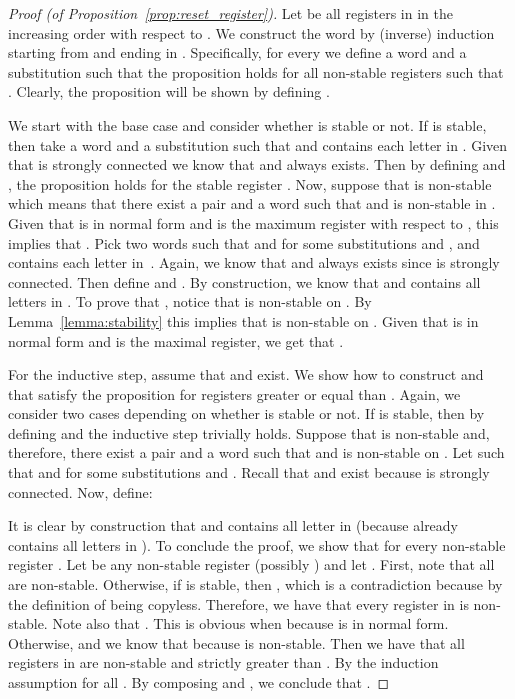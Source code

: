 \begin{proof}[Proof (of Proposition~\ref{prop:reset_register})]
	Let  be all registers in  in the increasing order with respect to . We construct the word  by (inverse) induction starting from  and ending in .
	Specifically, for every  we define a word  and a substitution  such that the proposition holds for all non-stable registers  such that .
	Clearly, the proposition  will be shown by defining .
	
	We start with the base case  and consider whether  is stable or not.
	If  is stable, then take a word  and a substitution  such that  and  contains each letter in .
	Given that  is strongly connected we know that  and  always exists. 
	Then by defining  and , the proposition holds for the stable register .
	Now, suppose that  is non-stable which means that there exist a pair  and a word  such that  and  is non-stable in .
	Given that  is in normal form and  is the maximum register with respect to , this implies that .
	Pick two words  such that  and  for some substitutions  and , and  contains each letter in~.
	Again, we know that  and  always exists since  is strongly connected.
	Then define   and  .
	By construction, we know that  and  contains all letters in . 
	To prove that , notice that  is non-stable on .
	By Lemma~\ref{lemma:stability} this implies that  is non-stable on .
	Given that  is in normal form and  is the maximal register, we get that .
	
	For the inductive step, assume that  and  exist. We show how to construct  and  that satisfy the proposition for registers greater or equal than . 
	Again, we consider two cases depending on whether  is stable or not. 
	If  is stable, then by defining  and  the inductive step trivially holds.
Suppose that  is non-stable and, therefore, there exist a pair   and a word  such that  and  is non-stable on .
	Let  such that  and  for some substitutions  and .
	Recall that  and  exist because  is strongly connected. 
	Now, define:
	
	It is clear by construction that   and  contains all letter in 
	(because already  contains all letters in ). 
	To conclude the proof, we show that  for every non-stable register . 
	Let  be any non-stable register  (possibly ) and let . 
	First, note that all  are non-stable.
	Otherwise, if  is stable, then , which is a contradiction because  by the definition of being copyless.  
	Therefore, we have that every register in  is non-stable.
	Note also that .
	This is obvious when  because  is in normal form. Otherwise,  and we know that  because  is non-stable.
	Then we have that all registers in  are non-stable and strictly greater than . 
	By the induction assumption  for all . By composing  and , we conclude that .
\end{proof}




